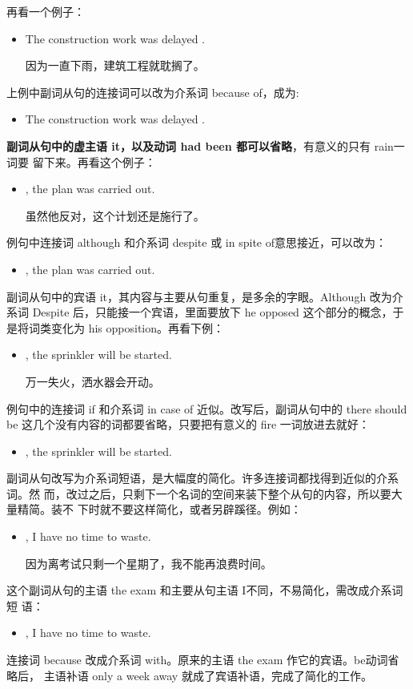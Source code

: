 再看一个例子：
\begin{itemize}
\item The construction work was delayed .

  因为一直下雨，建筑工程就耽搁了。
\end{itemize}
上例中副词从句的连接词可以改为介系词 because of，成为:
\begin{itemize}
\item The construction work was delayed .
\end{itemize}
\textbf{副词从句中的虚主语 it，以及动词 had been 都可以省略}，有意义的只有 rain一词要
留下来。再看这个例子：
\begin{itemize}
\item {}, the plan was carried out.

  虽然他反对，这个计划还是施行了。
\end{itemize}
例句中连接词 although 和介系词 despite 或 in spite of意思接近，可以改为：
\begin{itemize}
\item {}, the plan was carried out.
\end{itemize}
副词从句中的宾语 it，其内容与主要从句重复，是多余的字眼。Although
改为介系词 Despite 后，只能接一个宾语，里面要放下 he opposed
这个部分的概念，于是将词类变化为 his opposition。再看下例：
\begin{itemize}
\item {}, the sprinkler will be started.

  万一失火，洒水器会开动。
\end{itemize}
例句中的连接词 if 和介系词 in case of 近似。改写后，副词从句中的 there
should be 这几个没有内容的词都要省略，只要把有意义的 fire
一词放进去就好：
\begin{itemize}
\item {}, the sprinkler will be started.
\end{itemize}

副词从句改写为介系词短语，是大幅度的简化。许多连接词都找得到近似的介系词。然
而，改过之后，只剩下一个名词的空间来装下整个从句的内容，所以要大量精简。装不
下时就不要这样简化，或者另辟蹊径。例如：
\begin{itemize}
\item {}   , I have no time to waste.

  因为离考试只剩一个星期了，我不能再浪费时间。
\end{itemize}
这个副词从句的主语 the exam 和主要从句主语 I不同，不易简化，需改成介系词短
语：
\begin{itemize}
\item {}  , I have
  no time to waste.
\end{itemize}
连接词 because 改成介系词 with。原来的主语 the exam 作它的宾语。be动词省略后，
主语补语 only a week away 就成了宾语补语，完成了简化的工作。

